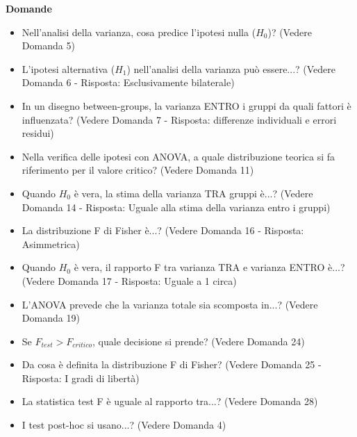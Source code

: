 \documentclass[12pt, a4paper]{article}
\newenvironment{reflectionbox}{%
    \medskip
    \begin{framed}\par\noindent
    \textbf{\color{boxtitlecolor}Domande} \par
    \begin{itemize}[leftmargin=*, label=$\blacktriangleright$]
}{%
    \end{itemize}\par
    \end{framed}
    \medskip
}
\newcommand{\Fscore}{F} %
\newcommand{\Hnull}{H_0} %
\newcommand{\Halt}{H_1} %
\begin{document}
\begin{reflectionbox}
    \item Nell'analisi della varianza, cosa predice l'ipotesi nulla ($\Hnull$)? (Vedere Domanda 5)
    \item L'ipotesi alternativa ($\Halt$) nell'analisi della varianza può essere...? (Vedere Domanda 6 - Risposta: Esclusivamente bilaterale)
    \item In un disegno between-groups, la varianza ENTRO i gruppi da quali fattori è influenzata? (Vedere Domanda 7 - Risposta: differenze individuali e errori residui)
    \item Nella verifica delle ipotesi con ANOVA, a quale distribuzione teorica si fa riferimento per il valore critico? (Vedere Domanda 11)
    \item Quando $\Hnull$ è vera, la stima della varianza TRA gruppi è...? (Vedere Domanda 14 - Risposta: Uguale alla stima della varianza entro i gruppi)
    \item La distribuzione F di Fisher è...? (Vedere Domanda 16 - Risposta: Asimmetrica)
    \item Quando $\Hnull$ è vera, il rapporto F tra varianza TRA e varianza ENTRO è...? (Vedere Domanda 17 - Risposta: Uguale a 1 circa)
    \item L'ANOVA prevede che la varianza totale sia scomposta in...? (Vedere Domanda 19)
    \item Se $\Fscore_{test} > \Fscore_{critico}$, quale decisione si prende? (Vedere Domanda 24)
    \item Da cosa è definita la distribuzione F di Fisher? (Vedere Domanda 25 - Risposta: I gradi di libertà)
    \item La statistica test F è uguale al rapporto tra...? (Vedere Domanda 28)
    \item I test post-hoc si usano...? (Vedere Domanda 4)
\end{reflectionbox}
\end{document}
